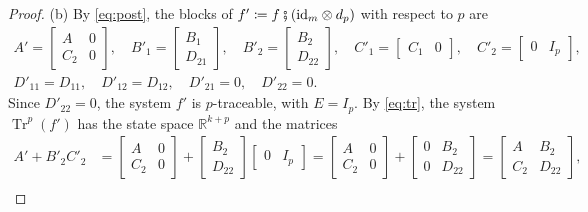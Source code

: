 \documentclass[11pt,a4paper]{article}
\theoremstyle{plain}
\theoremstyle{definition}
\theoremstyle{remark}
\DeclareMathOperator{\Tr}{Tr}
\newcommand{\R}{\mathbb{R}}
\newcommand{\id}{\mathrm{id}}
\newcommand{\then}{\mathbin{\fatsemi}}
\begin{document}
\begin{proof}
    (b) By \cref{eq:post}, the blocks of $f' \coloneqq f \then (\id_m \otimes d_p)$ with respect to $p$ are
    \begin{equation*}
        \begin{gathered}
            A' = \begin{bmatrix} A & 0 \\ C_2 & 0 \end{bmatrix},
            \quad
            B'_1 = \begin{bmatrix} B_1 \\ D_{21} \end{bmatrix},
            \quad
            B'_2 = \begin{bmatrix} B_2 \\ D_{22} \end{bmatrix},
            \quad
            C'_1 = \begin{bmatrix} C_1 & 0 \end{bmatrix},
            \quad
            C'_2 = \begin{bmatrix} 0 & I_p \end{bmatrix}, \\
            D'_{11} = D_{11}, \quad D'_{12} = D_{12}, \quad D'_{21} = 0, \quad D'_{22} = 0 .
        \end{gathered}
    \end{equation*}
    Since $D'_{22} = 0$, the system $f'$ is $p$-traceable, with $E = I_p$.
    By \cref{eq:tr}, the system $\Tr^p(f')$ has the state space $\R^{k+p}$ and the matrices
    \begin{align*}
        A' + B'_2 C'_2
         & = \begin{bmatrix} A & 0 \\ C_2 & 0 \end{bmatrix} + \begin{bmatrix} B_2 \\ D_{22} \end{bmatrix} \begin{bmatrix} 0 & I_p \end{bmatrix}
        = \begin{bmatrix} A & 0 \\ C_2 & 0 \end{bmatrix} + \begin{bmatrix} 0 & B_2 \\ 0 & D_{22} \end{bmatrix}
        = \begin{bmatrix} A & B_2 \\ C_2 & D_{22} \end{bmatrix}, \\

\end{align*}
\end{proof}
\end{document}
